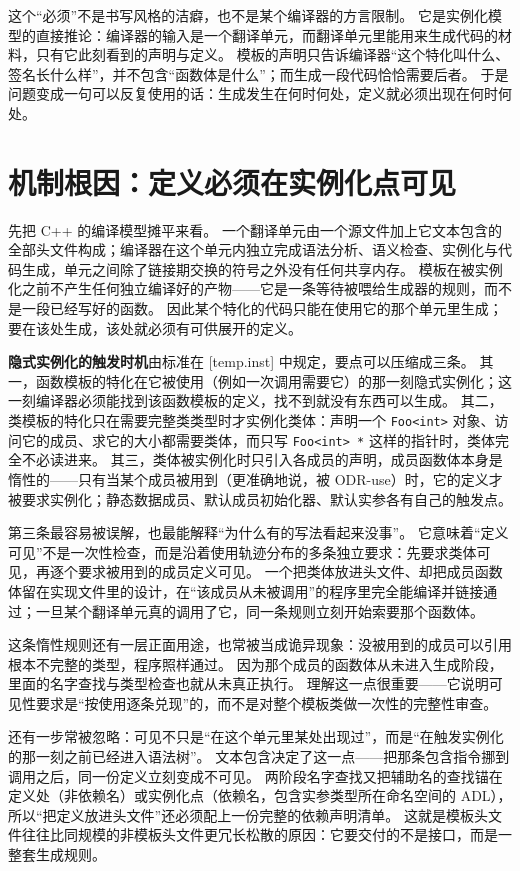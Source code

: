\documentclass[12pt,a4paper,fontset=fandol]{ctexbook}
\newcommand{\cpp}[1]{C++#1}
\newcommand{\kw}[1]{\texttt{#1}}
\begin{document}
这个“必须”不是书写风格的洁癖，也不是某个编译器的方言限制。
它是实例化模型的直接推论：编译器的输入是一个翻译单元，而翻译单元里能用来生成代码的材料，只有它此刻看到的声明与定义。
模板的声明只告诉编译器“这个特化叫什么、签名长什么样”，并不包含“函数体是什么”；而生成一段代码恰恰需要后者。
于是问题变成一句可以反复使用的话：生成发生在何时何处，定义就必须出现在何时何处。

\section{机制根因：定义必须在实例化点可见}

先把 \cpp{} 的编译模型摊平来看。
一个翻译单元由一个源文件加上它文本包含的全部头文件构成；编译器在这个单元内独立完成语法分析、语义检查、实例化与代码生成，单元之间除了链接期交换的符号之外没有任何共享内存。
模板在被实例化之前不产生任何独立编译好的产物——它是一条等待被喂给生成器的规则，而不是一段已经写好的函数。
因此某个特化的代码只能在使用它的那个单元里生成；要在该处生成，该处就必须有可供展开的定义。

\textbf{隐式实例化的触发时机}由标准在 [temp.inst] 中规定，要点可以压缩成三条。
其一，函数模板的特化在它被使用（例如一次调用需要它）的那一刻隐式实例化；这一刻编译器必须能找到该函数模板的定义，找不到就没有东西可以生成。
其二，类模板的特化只在需要完整类类型时才实例化类体：声明一个 \kw{Foo<int>} 对象、访问它的成员、求它的大小都需要类体，而只写 \kw{Foo<int> *} 这样的指针时，类体完全不必读进来。
其三，类体被实例化时只引入各成员的声明，成员函数体本身是惰性的——只有当某个成员被用到（更准确地说，被 ODR-use）时，它的定义才被要求实例化；静态数据成员、默认成员初始化器、默认实参各有自己的触发点。

第三条最容易被误解，也最能解释“为什么有的写法看起来没事”。
它意味着“定义可见”不是一次性检查，而是沿着使用轨迹分布的多条独立要求：先要求类体可见，再逐个要求被用到的成员定义可见。
一个把类体放进头文件、却把成员函数体留在实现文件里的设计，在“该成员从未被调用”的程序里完全能编译并链接通过；一旦某个翻译单元真的调用了它，同一条规则立刻开始索要那个函数体。

这条惰性规则还有一层正面用途，也常被当成诡异现象：没被用到的成员可以引用根本不完整的类型，程序照样通过。
因为那个成员的函数体从未进入生成阶段，里面的名字查找与类型检查也就从未真正执行。
理解这一点很重要——它说明可见性要求是“按使用逐条兑现”的，而不是对整个模板类做一次性的完整性审查。

还有一步常被忽略：可见不只是“在这个单元里某处出现过”，而是“在触发实例化的那一刻之前已经进入语法树”。
文本包含决定了这一点——把那条包含指令挪到调用之后，同一份定义立刻变成不可见。
两阶段名字查找又把辅助名的查找锚在定义处（非依赖名）或实例化点（依赖名，包含实参类型所在命名空间的 ADL），所以“把定义放进头文件”还必须配上一份完整的依赖声明清单。
这就是模板头文件往往比同规模的非模板头文件更冗长松散的原因：它要交付的不是接口，而是一整套生成规则。
\end{document}
